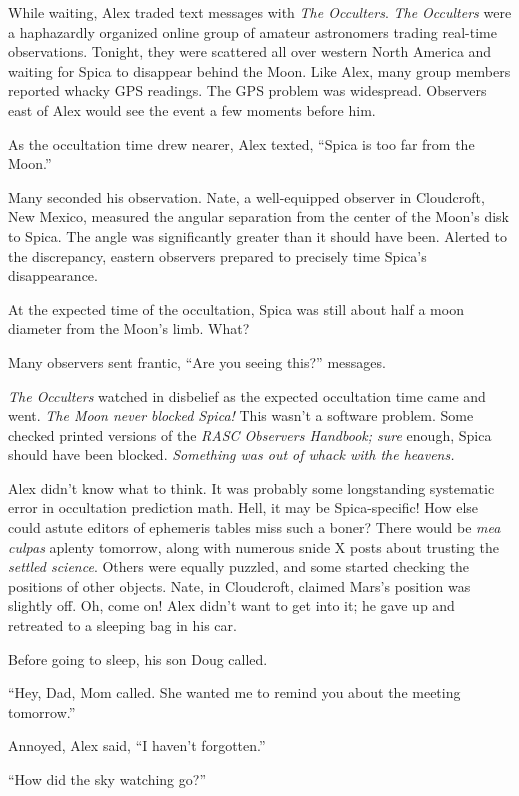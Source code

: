 While waiting, Alex traded text messages with \emph{The Occulters}.
\emph{The Occulters} were a haphazardly organized online group of
amateur astronomers trading real-time observations. Tonight, they were
scattered all over western North America and waiting for Spica to
disappear behind the Moon. Like Alex, many group members reported whacky
GPS readings. The GPS problem was widespread. Observers east of Alex
would see the event a few moments before him.

As the occultation time drew nearer, Alex texted, ``Spica is too far
from the Moon.''

Many seconded his observation. Nate, a well-equipped observer in
Cloudcroft, New Mexico, measured the angular separation from the center
of the Moon's disk to Spica. The angle was significantly greater than it
should have been. Alerted to the discrepancy, eastern observers prepared
to precisely time Spica's disappearance.

At the expected time of the occultation, Spica was still about half a
moon diameter from the Moon's limb. What?

Many observers sent frantic, ``Are you seeing this?'' messages.

\emph{The Occulters} watched in disbelief as the expected occultation
time came and went. \emph{The Moon never blocked Spica!} This wasn't a
software problem. Some checked printed versions of the \emph{RASC
Observers Handbook; sure} enough, Spica should have been blocked.
\emph{Something was out of whack with the heavens.}

Alex didn't know what to think. It was probably some longstanding
systematic error in occultation prediction math. Hell, it may be
Spica-specific! How else could astute editors of ephemeris tables miss
such a boner? There would be \emph{mea culpas} aplenty tomorrow, along
with numerous snide X posts about trusting the \emph{settled science}.
Others were equally puzzled, and some started checking the positions of
other objects. Nate, in Cloudcroft, claimed Mars's position was slightly
off. Oh, come on! Alex didn't want to get into it; he gave up and
retreated to a sleeping bag in his car.

Before going to sleep, his son Doug called.

``Hey, Dad, Mom called. She wanted me to remind you about the meeting
tomorrow.''

Annoyed, Alex said, ``I haven't forgotten.''

``How did the sky watching go?''


